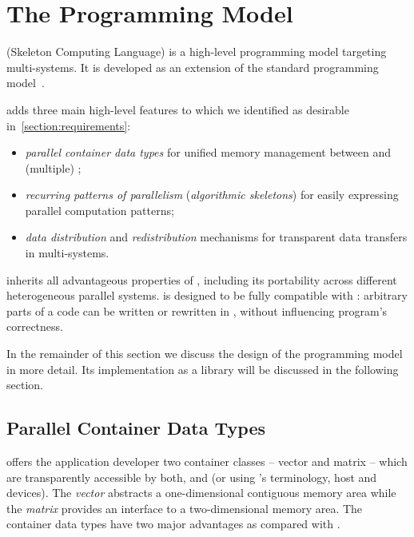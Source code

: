 \pagebreak
\section{The \SkelCL Programming Model}
\label{section:skelcl-programming-model}
\SkelCL (Skeleton Computing Language) is a high-level programming model targeting multi-\GPU systems.
It is developed as an extension of the standard \OpenCL programming model~\cite{OpenCL}.

\SkelCL adds three main high-level features to \OpenCL which we identified as desirable in~\autoref{section:requirements}:

\begin{itemize}
  \item \emph{parallel container data types} for unified memory management between \CPU and (multiple) \GPUs;
  \item \emph{recurring patterns of parallelism} (\aka \emph{algorithmic skeletons}) for easily expressing parallel computation patterns;
  \item \emph{data distribution} and \emph{redistribution} mechanisms for transparent data transfers in multi-\GPU systems.
\end{itemize}

\noindent
\SkelCL inherits all advantageous properties of \OpenCL, including its portability across different heterogeneous parallel systems.
\SkelCL is designed to be fully compatible with \OpenCL: arbitrary parts of a \SkelCL code can be written or rewritten in \OpenCL, without influencing program's correctness.

\noindent
In the remainder of this section we discuss the design of the \SkelCL programming model in more detail.
Its implementation as a \Cpp library will be discussed in the following section.

\subsection{Parallel Container Data Types}
\label{section:skelcl-programming-model:container}
\SkelCL offers the application developer two container classes -- vector and matrix -- which are transparently accessible by both, \CPU and \GPUs (or using \OpenCL's terminology, host and devices).
The \emph{vector} abstracts a one-dimensional contiguous memory area while the \emph{matrix} provides an interface to a two-dimensional memory area.
The \SkelCL container data types have two major advantages as compared with \OpenCL.

